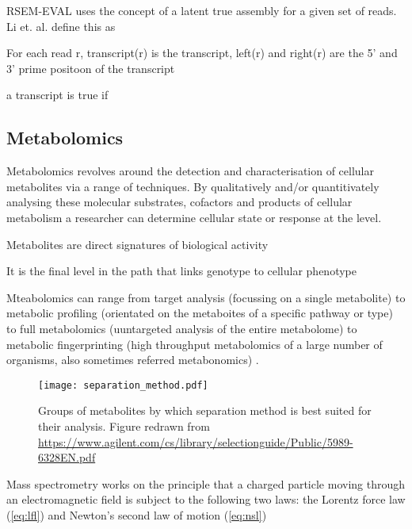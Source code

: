 

RSEM-EVAL uses the concept of a latent true assembly for a given set of 
reads.  Li et. al. define this as 

For each read r, transcript(r) is the transcript, left(r) and right(r) are the 5' and 3' prime
positoon of the transcript 

a transcript is true if 


\subsection{Metabolomics}

Metabolomics revolves around the detection and characterisation of cellular metabolites via a range of techniques.
By qualitatively and/or quantitivately analysing these molecular substrates, cofactors and products of cellular metabolism
a researcher can determine cellular state or response at the level.

Metabolites are direct signatures of biological activity \citep{}


It is the final level in the path that links genotype to cellular phenotype \citep{Fiehn2002}



Mteabolomics can range from target analysis (focussing on a single metabolite) to 
metabolic profiling (orientated on the metaboites of a specific pathway or type) to
full metabolomics (uuntargeted analysis of the entire metabolome) to metabolic fingerprinting
(high throughput metabolomics of a large number of organisms, also sometimes referred
metabonomics) \citep{Fiehn2002}.




\begin{figure}
    \texttt{[image: separation\_method.pdf]}
    \caption[Compounds by MS Separation Method]{Groups of metabolites by which separation method is best 
    suited for their analysis. Figure redrawn from \url{https://www.agilent.com/cs/library/selectionguide/Public/5989-6328EN.pdf}}
\end{figure}


Mass spectrometry works on the principle that a charged particle moving through an electromagnetic field
is subject to the following two laws: the Lorentz force law (\cref{eq:lfl}) and Newton's second law of motion (\cref{eq:nsl})

